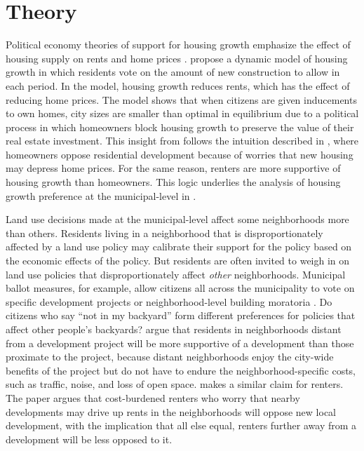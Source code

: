 \documentclass[article,11pt]{memoir}
\begin{document}
\section{Theory}\label{sec:theory}

Political economy theories of support for housing growth emphasize the effect of housing supply on rents and home prices \citep{fischel_homevoter_2001,hilber_origins_2013,ortalo-magne_political_2014}. \cite{ortalo-magne_political_2014} propose a dynamic model of housing growth in which residents vote on the amount of new construction to allow in each period. In the model, housing growth reduces rents, which has the effect of reducing home prices. The model shows that when citizens are given inducements to own homes, city sizes are smaller than optimal in equilibrium due to a political process in which homeowners block housing growth to preserve the value of their real estate investment. This insight from \cite{ortalo-magne_political_2014} follows the intuition described in \cite{fischel_homevoter_2001}, where homeowners oppose residential development because of worries that new housing may depress home prices. For the same reason, renters are more supportive of housing growth than homeowners. This logic underlies the analysis of housing growth preference at the municipal-level in \cite{hankinson_when_2018}.

Land use decisions made at the municipal-level affect some neighborhoods more than others. Residents living in a neighborhood that is disproportionately affected by a land use policy may calibrate their support for the policy based on the economic effects of the policy. But residents are often invited to weigh in on land use policies that disproportionately affect \emph{other} neighborhoods. Municipal ballot measures, for example, allow citizens all across the municipality to vote on specific development projects or neighborhood-level building moratoria \citep{gerber_development_2003,hankinson_when_2018}. Do citizens who say ``not in my backyard'' form different preferences for policies that affect other people's backyards? \cite{gerber_development_2003} argue that residents in neighborhoods distant from a development project will be more supportive of a development than those proximate to the project, because distant neighborhoods enjoy the city-wide benefits of the project but do not have to endure the neighborhood-specific costs, such as traffic, noise, and loss of open space. \cite{hankinson_when_2018} makes a similar claim for renters. The paper argues that cost-burdened renters who worry that nearby developments may drive up rents in the neighborhoods will oppose new local development, with the implication that all else equal, renters further away from a development will be less opposed to it.
\end{document}
